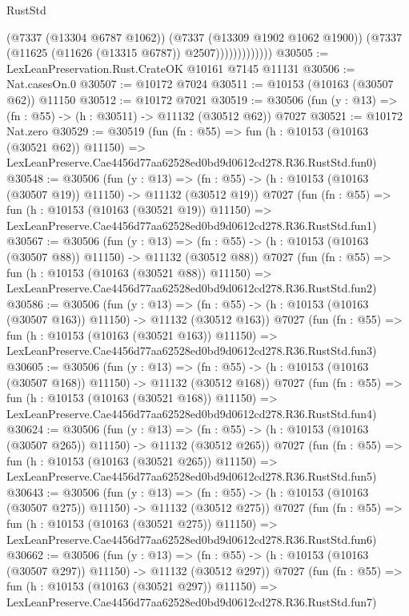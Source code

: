 \begin{lexlean}{RustStd}
\begin{coremodule}
                          (@7337 (@13304 @6787 @1062))
                          (@7337 (@13309 @1902 @1062 @1900))
                          (@7337 (@11625 (@11626 (@13315 @6787)) @2507)))))))))))))
@30505 := LexLeanPreservation.Rust.CrateOK @10161 @7145 @11131
@30506 := Nat.casesOn.{0}
@30507 := @10172 @7024
@30511 := @10153 (@10163 (@30507 @62)) @11150
@30512 := @10172 @7021
@30519 := @30506 (fun (y : @13) => (fn : @55) -> (h : @30511) -> @11132 (@30512 @62)) @7027
@30521 := @10172 Nat.zero
@30529 := @30519
    (fun (fn : @55) =>
    fun (h : @10153 (@10163 (@30521 @62)) @11150) =>
    LexLeanPreserve.Cae4456d77aa62528ed0bd9d0612cd278.R36.RustStd.fun0)
@30548 := @30506
    (fun (y : @13) =>
    (fn : @55) -> (h : @10153 (@10163 (@30507 @19)) @11150) -> @11132 (@30512 @19))
    @7027
    (fun (fn : @55) =>
    fun (h : @10153 (@10163 (@30521 @19)) @11150) =>
    LexLeanPreserve.Cae4456d77aa62528ed0bd9d0612cd278.R36.RustStd.fun1)
@30567 := @30506
    (fun (y : @13) =>
    (fn : @55) -> (h : @10153 (@10163 (@30507 @88)) @11150) -> @11132 (@30512 @88))
    @7027
    (fun (fn : @55) =>
    fun (h : @10153 (@10163 (@30521 @88)) @11150) =>
    LexLeanPreserve.Cae4456d77aa62528ed0bd9d0612cd278.R36.RustStd.fun2)
@30586 := @30506
    (fun (y : @13) =>
    (fn : @55) -> (h : @10153 (@10163 (@30507 @163)) @11150) -> @11132 (@30512 @163))
    @7027
    (fun (fn : @55) =>
    fun (h : @10153 (@10163 (@30521 @163)) @11150) =>
    LexLeanPreserve.Cae4456d77aa62528ed0bd9d0612cd278.R36.RustStd.fun3)
@30605 := @30506
    (fun (y : @13) =>
    (fn : @55) -> (h : @10153 (@10163 (@30507 @168)) @11150) -> @11132 (@30512 @168))
    @7027
    (fun (fn : @55) =>
    fun (h : @10153 (@10163 (@30521 @168)) @11150) =>
    LexLeanPreserve.Cae4456d77aa62528ed0bd9d0612cd278.R36.RustStd.fun4)
@30624 := @30506
    (fun (y : @13) =>
    (fn : @55) -> (h : @10153 (@10163 (@30507 @265)) @11150) -> @11132 (@30512 @265))
    @7027
    (fun (fn : @55) =>
    fun (h : @10153 (@10163 (@30521 @265)) @11150) =>
    LexLeanPreserve.Cae4456d77aa62528ed0bd9d0612cd278.R36.RustStd.fun5)
@30643 := @30506
    (fun (y : @13) =>
    (fn : @55) -> (h : @10153 (@10163 (@30507 @275)) @11150) -> @11132 (@30512 @275))
    @7027
    (fun (fn : @55) =>
    fun (h : @10153 (@10163 (@30521 @275)) @11150) =>
    LexLeanPreserve.Cae4456d77aa62528ed0bd9d0612cd278.R36.RustStd.fun6)
@30662 := @30506
    (fun (y : @13) =>
    (fn : @55) -> (h : @10153 (@10163 (@30507 @297)) @11150) -> @11132 (@30512 @297))
    @7027
    (fun (fn : @55) =>
    fun (h : @10153 (@10163 (@30521 @297)) @11150) =>
    LexLeanPreserve.Cae4456d77aa62528ed0bd9d0612cd278.R36.RustStd.fun7)

\end{coremodule}
\end{lexlean}
